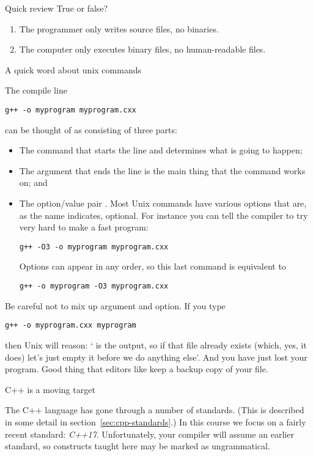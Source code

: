 \begin{exercise}{Quick review}
  \label{q:compiler}
  True or false?
  \begin{enumerate}
  \item The programmer only writes source files, no binaries.
  \item The computer only executes binary files, no human-readable files.
  \end{enumerate}
\end{exercise}

 {A quick word about unix commands}

The compile line
\begin{verbatim}
g++ -o myprogram myprogram.cxx
\end{verbatim}
can be thought of as consisting of three parts:
\begin{itemize}
\item The command  that starts the line and determines what is
  going to happen;
\item The argument  that ends the line is the main
  thing that the command works on; and
\item The option/value pair . Most Unix commands have
  various options that are, as the name indicates, optional. For
  instance you can tell the compiler to try very hard to make a fast program:
\begin{verbatim}
g++ -O3 -o myprogram myprogram.cxx
\end{verbatim}
  Options can appear in any order, so this last command is equivalent to
\begin{verbatim}
g++ -o myprogram -O3 myprogram.cxx
\end{verbatim}
\end{itemize}
Be careful not to mix up argument and option. If you type
\begin{verbatim}
g++ -o myprogram.cxx myprogram
\end{verbatim}
then Unix will reason: ` is the output, so if that
file already exists (which, yes, it does) let's just empty it before
we do anything else'. And you have just lost your program.
Good thing that editors like
 keep a backup copy of your file.

 {C++ is a moving target}

The C++ language has gone through a number of standards. (This is
described in some detail in section~\ref{sec:cpp-standards}.) In this
course we focus on a fairly recent standard: 
\emph{C++17}.
Unfortunately, your compiler will assume an earlier standard, so
constructs taught here may be marked as ungrammatical.

